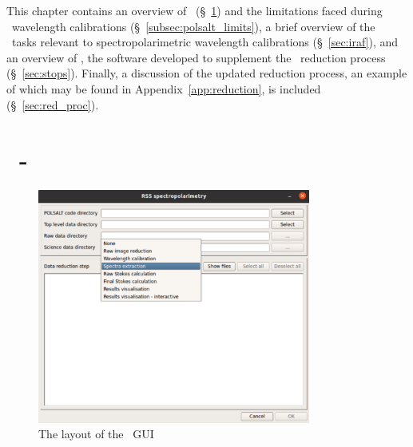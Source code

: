 
This chapter contains an overview of \polsalt\ (\S~\ref{sec:polsalt}) and the limitations faced during \polsalt\ wavelength calibrations (\S~\ref{subsec:polsalt_limits}), a brief overview of the \iraf\ tasks relevant to spectropolarimetric wavelength calibrations (\S~\ref{sec:iraf}), and an overview of \stops, the software developed to supplement the \polsalt\ reduction process (\S~\ref{sec:stops}). Finally, a discussion of the updated reduction process, an example of which may be found in Appendix~\ref{app:reduction}, is included (\S~\ref{sec:red_proc}).

\section[\polsalt]{\polsalt\ - } \label{sec:polsalt}

\begin{figure}[t]
    \centering
    \includegraphics[width = 0.8\textwidth]{figures/2_polsalt_gui.png}
    \caption{The layout of the \polsalt\ \gls{GUI}}
    \label{fig:polsalt_gui}
\end{figure}

